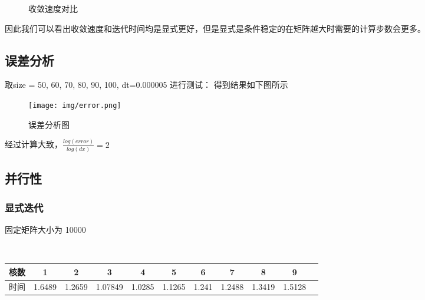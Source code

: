 \documentclass[10pt, a4paper]{article}
\begin{document}
\begin{figure}[H]
\centering
{}%
%
\centering
\caption{ 收敛速度对比}
\end{figure}

因此我们可以看出收敛速度和迭代时间均是显式更好，但是显式是条件稳定的在矩阵越大时需要的计算步数会更多。

\subsection{误差分析}
取size = 50, 60, 70, 80, 90, 100, dt=0.000005 进行测试：
得到结果如下图所示

\begin{figure}[!h]
\centering
\texttt{[image: img/error.png]}
\caption{误差分析图}
\label{fig:1}
\end{figure}

经过计算大致，$\frac{log(error)}{log(dx)}=2$

\subsection{并行性}
\subsubsection{显式迭代}
固定矩阵大小为  10000

~\\

\begin{tabular}{|c|c|c|c|c|c|c|c|c|c|c|}%
\hline  %
核数&1&2&3&4&5&6&7&8&9\\
\hline  %
时间&1.6489&1.2659&1.07849&1.0285&1.1265&1.241&1.2488&1.3419&1.5128\\
\hline %
\end{tabular}
\end{document}
